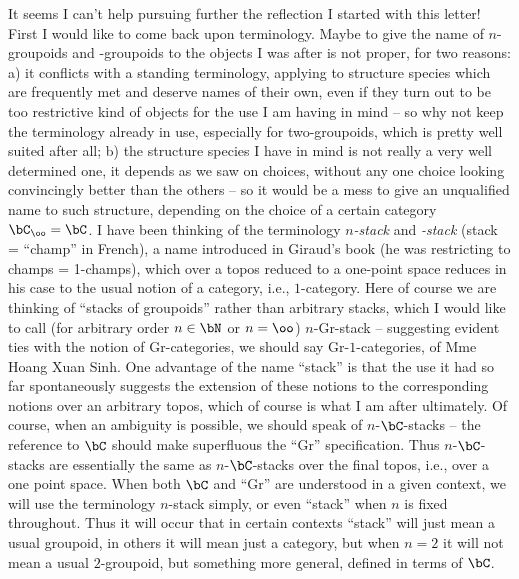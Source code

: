 \label{sec:13}%
It seems I can't help pursuing further the reflection I started with
this letter! First I would like to come back upon terminology. Maybe
to give the name of $n$-groupoids and \oo-groupoids to the objects I
was after is not proper, for two reasons: a) it conflicts with a
standing terminology, applying to structure species which are
frequently met and deserve names of their own, even if they turn out
to be too restrictive kind of objects for the use I am having in mind
-- so why not keep the terminology already in use, especially for
two-groupoids, which is pretty well suited after all; b) the structure
species I have in mind is not really a very well determined one, it
depends as we saw on choices, without any one choice looking
convincingly better than the others -- so it would be a mess to give
an unqualified name to such structure, depending on the choice of a
certain category $\bC_\oo = \bC$. I have been thinking of the
terminology \emph{$n$-stack} and \emph{\oo-stack} (stack = ``champ'' in French), a
name introduced in Giraud's book (he was restricting to champs =
1-champs), which over a topos reduced to a one-point space reduces in
his case to the usual notion of a category, i.e., $1$-category. Here
of course we are thinking of ``stacks of groupoids'' rather than
arbitrary stacks, which I would like to call (for arbitrary order
$n\in\bN$ or $n=\oo$) $n$-Gr-stack -- suggesting evident ties with the
notion of Gr-categories, we should say Gr-$1$-categories, of Mme Hoang
Xuan Sinh. One advantage of the name ``stack'' is that the use it had
so far spontaneously suggests the extension of these notions to the
corresponding notions over an arbitrary topos, which of course is what
I am after ultimately. Of course, when an ambiguity is possible, we
should speak of $n$-$\bC$-stacks -- the reference to $\bC$
should make superfluous the ``Gr'' specification. Thus $n$-$\bC$-stacks
are essentially the same as $n$-$\bC$-stacks over the
final topos, i.e., over a one point space. When both $\bC$ and
``Gr'' are understood in a given context, we will use the terminology
$n$-stack simply, or even ``stack'' when $n$ is fixed throughout. Thus
it will occur that in certain contexts ``stack'' will just mean a
usual groupoid, in others it will mean just a category, but when $n=2$
it will not mean a usual $2$-groupoid, but something more general,
defined in terms of $\bC$.

